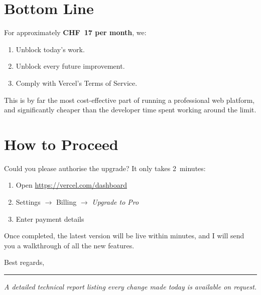 \documentclass[11pt,a4paper]{article}
\begin{document}
\section*{Bottom Line}

For approximately \textbf{CHF~17 per month}, we:
\begin{enumerate}[leftmargin=*]
  \item Unblock today's work.
  \item Unblock every future improvement.
  \item Comply with Vercel's Terms of Service.
\end{enumerate}

This is by far the most cost-effective part of running a professional web platform, and significantly cheaper than the developer time spent working around the limit.

\section*{How to Proceed}

Could you please authorise the upgrade? It only takes 2~minutes:

\begin{enumerate}[leftmargin=*]
  \item Open \url{https://vercel.com/dashboard}
  \item Settings $\rightarrow$ Billing $\rightarrow$ \emph{Upgrade to Pro}
  \item Enter payment details
\end{enumerate}

Once completed, the latest version will be live within minutes, and I will send you a walkthrough of all the new features.

\vspace{0.8cm}

\noindent Best regards,

\vspace{0.5cm}


\vspace{1.5cm}
\hrule
\vspace{0.5cm}

\noindent\textit{\small A detailed technical report listing every change made today is available on request.}
\end{document}
